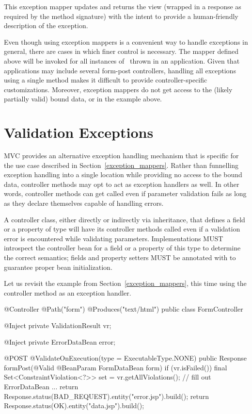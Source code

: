 This exception mapper updates  and returns the  view 
(wrapped in a response as required by the method signature) with the intent to provide a 
human-friendly description of the exception.

Even though using exception mappers is a convenient way to handle exceptions in general, 
there are cases in which finer control is necessary. The mapper defined above will be
invoked for all instances of \ConstVioExc\ thrown in an application. Given that 
applications may include several form-post controllers, handling all exceptions using
a single method makes it difficult to provide controller-specific customizations.
Moreover, exception mappers do not get access to the (likely partially valid) bound
data, or  in the example above.

\section{Validation Exceptions}
\label{validation_exceptions}

MVC provides an alternative exception handling mechanism that is specific for the 
use case described in Section~\ref{exception_mappers}. Rather than funnelling 
exception handling into a single location while providing no access to the bound
data, controller methods may opt to act as exception handlers as well. In other words, 
controller methods can get called even if parameter validation fails as long as
they declare themselves capable of handling errors.

A controller class, either directly or indirectly via inheritance, that defines 
a field or a property of type 
 will have its controller methods
called even if a validation error is encountered while validating parameters. 
Implementations MUST introspect the controller bean for a field or a property of
this type to determine the correct semantics; fields and property setters
MUST be annotated with  to guarantee proper bean initialization.

Let us revisit the example from Section~\ref{exception_mappers},
this time using the controller method as an exception handler.

\begin{listing}{1}
@Controller
@Path("form")
@Produces("text/html")
public class FormController {

    @Inject
    private ValidationResult vr;
    
    @Inject
    private ErrorDataBean error;

    @POST
    @ValidateOnExecution(type = ExecutableType.NONE)
    public Response formPost(@Valid @BeanParam FormDataBean form) {
        if (vr.isFailed()) {
            final Set<ConstraintViolation<?>> set = vr.getAllViolations();
            // fill out ErrorDataBean ...
            return Response.status(BAD_REQUEST).entity("error.jsp").build();
        }
        return Response.status(OK).entity("data.jsp").build();    
    }
}
\end{listing}

